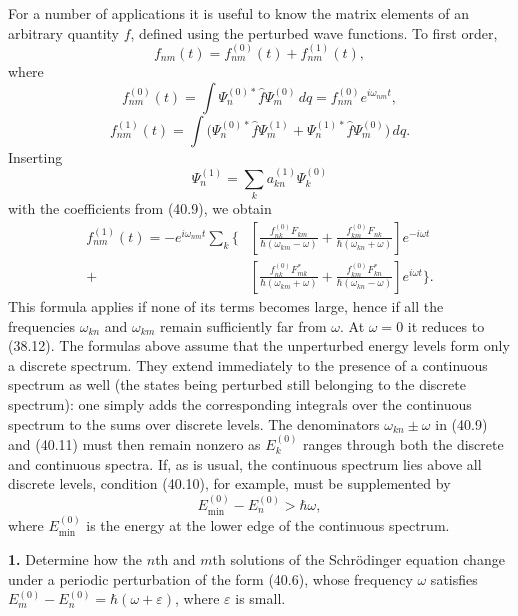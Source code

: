 For a number of applications it is useful to know the matrix elements of an
arbitrary quantity $f$, defined using the perturbed wave functions. To first
order,
\[
  f_{nm}(t)=f_{nm}^{(0)}(t)+f_{nm}^{(1)}(t),
\]
where
\[
  f_{nm}^{(0)}(t)=\int\Psi_n^{(0)*}\hat f\Psi_m^{(0)}\,dq
  =f_{nm}^{(0)}e^{i\omega_{nm}t},
\]
\[
  f_{nm}^{(1)}(t)=\int
  \bigl(\Psi_n^{(0)*}\hat f\Psi_m^{(1)}
       +\Psi_n^{(1)*}\hat f\Psi_m^{(0)}\bigr)\,dq.
\]
Inserting
\[
  \Psi_n^{(1)}=\sum_k a_{kn}^{(1)}\Psi_k^{(0)}
\]
with the coefficients from (40.9), we obtain
\begin{equation}
\begin{aligned}
  f_{nm}^{(1)}(t)=-e^{i\omega_{nm}t}\sum_k\Bigg\{&
  \left[
    \frac{f_{nk}^{(0)}F_{km}}{\hbar(\omega_{km}-\omega)}
    +\frac{f_{km}^{(0)}F_{nk}}{\hbar(\omega_{kn}+\omega)}
  \right]e^{-i\omega t} \\
  {}+&\left[
    \frac{f_{nk}^{(0)}F_{mk}^{*}}{\hbar(\omega_{km}+\omega)}
    +\frac{f_{km}^{(0)}F_{kn}^{*}}{\hbar(\omega_{kn}-\omega)}
  \right]e^{i\omega t}\Bigg\}.
\end{aligned}
  \tag{40.11}
\end{equation}
This formula applies if none of its terms becomes large, hence if all the
frequencies $\omega_{kn}$ and $\omega_{km}$ remain sufficiently far from
$\omega$. At $\omega=0$ it reduces to (38.12).
The formulas above assume that the unperturbed energy levels form only a
discrete spectrum. They extend immediately to the presence of a continuous
spectrum as well (the states being perturbed still belonging to the discrete
spectrum): one simply adds the corresponding integrals over the continuous
spectrum to the sums over discrete levels. The denominators
$\omega_{kn}\pm\omega$ in (40.9) and (40.11) must then remain nonzero as
$E_k^{(0)}$ ranges through both the discrete and continuous spectra. If, as
is usual, the continuous spectrum lies above all discrete levels, condition
(40.10), for example, must be supplemented by
\begin{equation}
  E_{\min}^{(0)}-E_n^{(0)}>\hbar\omega,
  \tag{40.12}
\end{equation}
where $E_{\min}^{(0)}$ is the energy at the lower edge of the continuous
spectrum.

\ProblemHeading

\textbf{1.} Determine how the $n$th and $m$th solutions of the Schrödinger
equation change under a periodic perturbation of the form (40.6), whose
frequency $\omega$ satisfies
$E_m^{(0)}-E_n^{(0)}=\hbar(\omega+\varepsilon)$, where $\varepsilon$ is
small.

